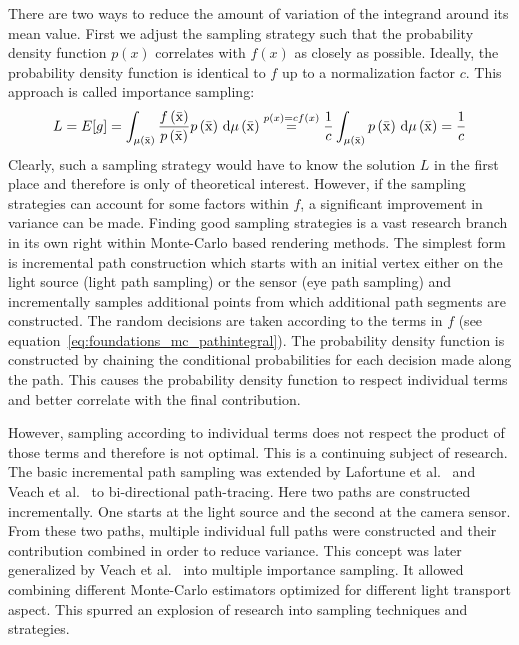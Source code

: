 There are two ways to reduce the amount of variation of the integrand around its mean value. First we adjust the sampling strategy such that the probability density function $p\left(x\right)$ correlates with $f\left(x\right)$ as closely as possible. Ideally, the probability density function is identical to $f$ up to a normalization factor $c$. This approach is called importance sampling:
\begin{align}
L = E[g] =
\int_{\mu\left(\bar{\mathrm{x}}\right)} \frac{f\left(\bar{\mathrm{x}}\right)}{p\left(\bar{\mathrm{x}}\right)}p\left(\bar{\mathrm{x}}\right)
\,\mathrm{d}\mu\left(\bar{\mathrm{x}}\right)
\stackrel{p\left(x\right)=c f\left(x\right)}{=}
\frac{1}{c}\int_{\mu\left(\bar{\mathrm{x}}\right)} p\left(\bar{\mathrm{x}}\right)
\,\mathrm{d}\mu\left(\bar{\mathrm{x}}\right) = \frac{1}{c}
\end{align}
Clearly, such a sampling strategy would have to know the solution $L$ in the first place and therefore is only of theoretical interest. However, if the sampling strategies can account for some factors within $f$, a significant improvement in variance can be made. Finding good sampling strategies is a vast research branch in its own right within Monte-Carlo based rendering methods. The simplest form is incremental path construction which starts with an initial vertex either on the light source (light path sampling) or the sensor (eye path sampling) and incrementally samples additional points from which additional path segments are constructed. The random decisions are taken according to the terms in $f$ (see equation~\ref{eq:foundations_mc_pathintegral}). The probability density function is constructed by chaining the conditional probabilities for each decision made along the path. This causes the probability density function to respect individual terms and better correlate with the final contribution. 

However, sampling according to individual terms does not respect the product of those terms and therefore is not optimal. This is a continuing subject of research. The basic incremental path sampling was extended by Lafortune et al.~\cite{Lafortune93} and Veach et al.~\cite{Veach94} to bi-directional path-tracing. Here two paths are constructed incrementally. One starts at the light source and the second at the camera sensor. From these two paths, multiple individual full paths were constructed and their contribution combined in order to reduce variance. This concept was later generalized by Veach et al.~\cite{Veach95MIS} into multiple importance sampling. It allowed combining different Monte-Carlo estimators optimized for different light transport aspect. This spurred an explosion of research into sampling techniques and strategies.

